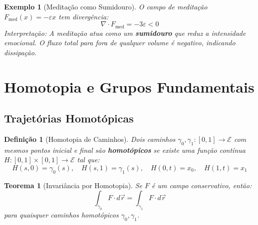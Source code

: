 \documentclass[12pt, a4paper]{article}
\newtheorem{definition}{Definição}
\newtheorem{theorem}{Teorema}
\newtheorem{example}{Exemplo}
\begin{document}
\begin{example}[Meditação como Sumidouro]
O campo de meditação $F_{\text{med}}(x) = -\varepsilon x$ tem divergência:
\[
\nabla \cdot F_{\text{med}} = -3\varepsilon < 0
\]
Interpretação: A meditação atua como um \textbf{sumidouro} que reduz a intensidade emocional. O fluxo total para fora de qualquer volume é negativo, indicando dissipação.
\end{example}

\section{Homotopia e Grupos Fundamentais}

\subsection{Trajetórias Homotópicas}

\begin{definition}[Homotopia de Caminhos]
Dois caminhos $\gamma_0, \gamma_1: [0,1] \to \mathcal{E}$ com mesmos pontos inicial e final são \textbf{homotópicos} se existe uma função contínua $H: [0,1] \times [0,1] \to \mathcal{E}$ tal que:
\[
H(s,0) = \gamma_0(s), \quad H(s,1) = \gamma_1(s), \quad H(0,t) = x_0, \quad H(1,t) = x_1
\]
\end{definition}

\begin{center}
\end{center}

\begin{theorem}[Invariância por Homotopia]
Se $F$ é um campo conservativo, então:
\[
\int_{\gamma_0} F \cdot d\vec{r} = \int_{\gamma_1} F \cdot d\vec{r}
\]
para quaisquer caminhos homotópicos $\gamma_0, \gamma_1$.
\end{theorem}
\end{document}
